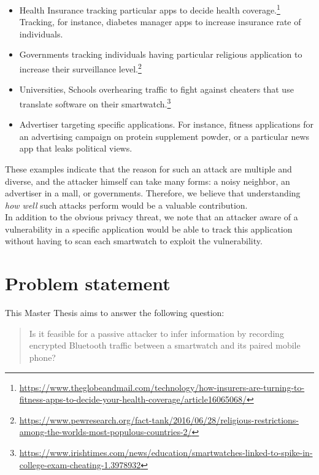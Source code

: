 \begin{itemize}
	\item Health Insurance tracking particular apps to decide health coverage.\footnote{\url{https://www.theglobeandmail.com/technology/how-insurers-are-turning-to-fitness-apps-to-decide-your-health-coverage/article16065068/}} Tracking, for instance, diabetes manager apps to increase insurance rate of individuals.
	
	\item Governments tracking individuals having particular religious application to increase their surveillance level.\footnote{\url{https://www.pewresearch.org/fact-tank/2016/06/28/religious-restrictions-among-the-worlds-most-populous-countries-2/}}

	\item Universities, Schools overhearing traffic to fight against cheaters that use translate software on their smartwatch.\footnote{\url{https://www.irishtimes.com/news/education/smartwatches-linked-to-spike-in-college-exam-cheating-1.3978932}}
	\item Advertiser targeting specific applications. For instance, fitness applications for an advertising campaign on protein supplement powder, or a particular news app that leaks political views.
\end{itemize}

\newpage

These examples indicate that the reason for such an attack are multiple and diverse, and the attacker himself can take many forms: a noisy neighbor, an advertiser in a mall, or governments. Therefore, we believe that understanding \emph{how well} such attacks perform would be a valuable contribution.
\\

In addition to the obvious privacy threat, we note that an attacker aware of a vulnerability in a specific application would be able to track this application without having to scan each smartwatch to exploit the vulnerability.


\section{Problem statement}
This Master Thesis aims to answer the following question:

\begin{quote}
Is it feasible for a passive attacker to infer information by recording encrypted Bluetooth traffic between a smartwatch and its paired mobile phone?    
\end{quote}

